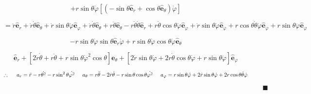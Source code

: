 \documentclass[12pt,a4paper]{article}
\begin{document}
\begin{enumerate}
      \begin{equation*}
          + r \sin{\theta} \dot{\varphi} [(-\sin{\theta}  \mathbf{\hat{e}}_r + \cos{\theta} \mathbf{\hat{e}}_\theta) \dot{\varphi}]
      \end{equation*}
      
      \begin{equation*}
          =\ddot{r}\mathbf{\hat{e}}_r + \dot{r}\dot{\theta} \hat{\mathbf{e}}_\theta + \dot{r}\sin{\theta} \dot{\varphi} \hat{\mathbf{e}}_\varphi + \dot{r} \dot{\theta} \mathbf{\hat{e}}_\theta + r \ddot{\theta} \mathbf{\hat{e}}_\theta   -r \dot{\theta} \dot{\theta} \hat{\mathbf{e}}_r +r \dot{\theta} \cos{\theta} \dot{\varphi} \hat{\mathbf{e}}_\varphi + \dot{r}\sin{\theta}\dot{\varphi}\mathbf{\hat{e}}_\varphi+ r \cos{\theta} \dot{\theta} \dot{\varphi} \mathbf{\hat{e}}_\varphi + r \sin{\theta} \ddot{\varphi} \mathbf{\hat{e}}_\varphi
      \end{equation*}
      
      \begin{equation*}
          - r \sin{\theta} \dot{\varphi} \sin{\theta}  \mathbf{\hat{e}}_r \dot{\varphi} +r \sin{\theta} \dot{\varphi} \cos{\theta} \dot{\varphi} \mathbf{\hat{e}}_\theta 
      \end{equation*}
      
      \begin{equation*}
          [\ddot{r}-r \dot{\theta}^2- r \sin{\theta} \dot{\varphi}^2 \sin{\theta}] \mathbf{\hat{e}}_r + [2\dot{r}\dot{\theta}+r \ddot{\theta}+r \sin{\theta} \dot{\varphi}^2 \cos{\theta}] \mathbf{\hat{e}}_\theta + [2\dot{r}\sin{\theta} \dot{\varphi} + 2r \dot{\theta} \cos{\theta} \dot{\varphi}+r \sin{\theta} \ddot{\varphi}]\mathbf{\hat{e}}_\varphi
      \end{equation*}
      
      \begin{equation*}
          \therefore \hspace{0.5cm} a_r = \ddot{r} - r \dot{\theta^2} - r \sin^2{\theta}\dot{\varphi^2} \hspace{0.5cm} a_\theta = r\ddot{\theta} - 2\dot{r}\dot{\theta} - r \sin{\theta} \cos{\theta} \dot{\varphi^2} \hspace{0.5cm} a_\varphi = r \sin{\theta} \ddot{\varphi}+ 2 \dot{r}\sin{\theta}\dot{\varphi} + 2 r \cos{\theta} \dot{\theta} \dot{\varphi}
      \end{equation*}
      
      \begin{equation*}
          \hspace{16cm} \blacksquare
      \end{equation*}
     

\end{enumerate}
\end{document}

